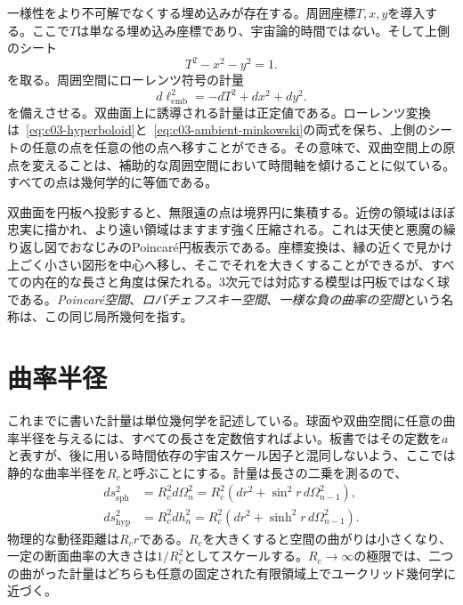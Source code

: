 一様性をより不可解でなくする埋め込みが存在する。周囲座標\(T,x,y\)を導入する。ここで\(T\)は単なる埋め込み座標であり、宇宙論的時間では\emph{な}い。そして上側のシート
\begin{equation}
T^2 - x^2 - y^2 = 1.
\label{eq:c03-hyperboloid}
\end{equation}
を取る。周囲空間にローレンツ符号の計量
\begin{equation}
d\ell_{\mathrm{emb}}^2=-dT^2+dx^2+dy^2.
\label{eq:c03-ambient-minkowski}
\end{equation}
を備えさせる。双曲面上に誘導される計量は正定値である。ローレンツ変換は~\eqref{eq:c03-hyperboloid}と~\eqref{eq:c03-ambient-minkowski}の両式を保ち、上側のシートの任意の点を任意の他の点へ移すことができる。その意味で、双曲空間上の原点を変えることは、補助的な周囲空間において時間軸を傾けることに似ている。すべての点は幾何学的に等価である。

双曲面を円板へ投影すると、無限遠の点は境界円に集積する。近傍の領域はほぼ忠実に描かれ、より遠い領域はますます強く圧縮される。これは天使と悪魔の繰り返し図でおなじみのPoincar\'e円板表示である。座標変換は、縁の近くで見かけ上ごく小さい図形を中心へ移し、そこでそれを大きくすることができるが、すべての内在的な長さと角度は保たれる。3次元では対応する模型は円板ではなく球である。\emph{Poincar\'e空間}、\emph{ロバチェフスキー空間}、\emph{一様な負の曲率の空間}という名称は、この同じ局所幾何を指す。

\begin{classroomqa}
\end{classroomqa}

\section{曲率半径}

これまでに書いた計量は単位幾何学を記述している。球面や双曲空間に任意の曲率半径を与えるには、すべての長さを定数倍すればよい。板書ではその定数を\(a\)と表すが、後に用いる時間依存の宇宙スケール因子と混同しないよう、ここでは静的な曲率半径を\(R_c\)と呼ぶことにする。計量は長さの二乗を測るので、
\begin{align}
ds_{\mathrm{sph}}^2
  &=R_c^2d\Omega_n^2
   =R_c^2\left(dr^2+\sin^2r\,d\Omega_{n-1}^2\right),\\
ds_{\mathrm{hyp}}^2
  &=R_c^2dh_n^2
   =R_c^2\left(dr^2+\sinh^2r\,d\Omega_{n-1}^2\right).
\label{eq:c03-scaled-curvature}
\end{align}
物理的な動径距離は\(R_cr\)である。\(R_c\)を大きくすると空間の曲がりは小さくなり、一定の断面曲率の大きさは\(1/R_c^2\)としてスケールする。\(R_c\to\infty\)の極限では、二つの曲がった計量はどちらも任意の固定された有限領域上でユークリッド幾何学に近づく。

